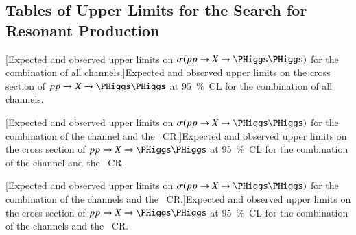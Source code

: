 \subsection{Tables of Upper Limits for the Search for Resonant \HH Production}%
\label{app:limit_tables}

{
  \centering

  \vspace*{17.5ex}

  [Expected and observed upper limits on
  $\sigma(\pp \to X \to \HH)$ for the combination of all channels.]{Expected and
    observed upper limits on the cross section of $\pp \to X \to \HH$ at
    \SI{95}{\percent}~CL for the combination of all channels.}%
  \label{tab:comb_limits_resonant}

  
}

\clearpage

{
  \centering

  \null\vfill

  [Expected and observed upper limits on
  $\sigma(\pp \to X \to \HH)$ for the combination of the \hadhad channel and
  the \ZHF~CR.]{Expected and observed upper limits on the cross section of
    $\pp \to X \to \HH$ at \SI{95}{\percent}~CL for the combination of the \hadhad
    channel and the \ZHF~CR.}%
  \label{tab:hadhad_limits_resonant}

  

  \null\vfill
}

\clearpage

{
  \centering

  \null\vfill

  [Expected and observed upper limits on
  $\sigma(\pp \to X \to \HH)$ for the combination of the \lephad channels and
  the \ZHF~CR.]{Expected and observed upper limits on the cross section of
    $\pp \to X \to \HH$ at \SI{95}{\percent}~CL for the combination of the
    \lephad channels and the \ZHF~CR.}%
  \label{tab:lephad_limits_resonant}

  

  \null\vfill
}


\clearpage
